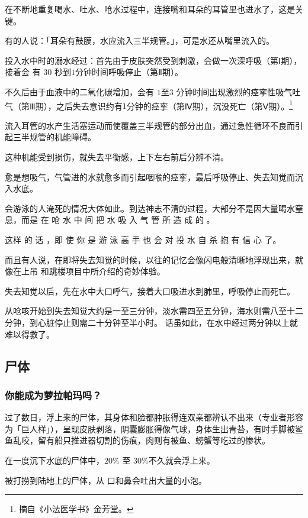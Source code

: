 \documentclass[UTF8]{ctexart}
\begin{document}
在不断地重复喝水、吐水、呛水过程中，连接嘴和耳朵的耳管里也进水了，这是关键。

有的人说：「耳朵有鼓膜，水应流入三半规管。」，可是水还从嘴里流入的。

投入水中时的溺水经过：首先由于皮肤突然受到刺激，会做一次深呼吸（第Ⅰ期），接着会 有 $30$ 秒到$1$分钟时间呼吸停止（第Ⅱ期）。

不久后由于血液中的二氧化碳增加，会有 $1$至$3$ 分钟时间出现激烈的痉挛性吸气吐气（第Ⅲ期），之后失去意识约有$1$分钟的痉挛（第Ⅳ期），沉没死亡（第Ⅴ期）。\footnote{摘自《小法医学书》金芳堂。}

流入耳管的水产生活塞运动而使覆盖三半规管的部分出血，通过急性循环不良而引起三半规管的机能障碍。

这种机能受到损伤，就失去平衡感，上下左右前后分辨不清。

愈是想吸气，气管进的水就愈多而引起咽喉的痉挛，最后呼吸停止、失去知觉而沉入水底。

会游泳的人淹死的情况大体如此。到达神志不清的过程，大部分不是因大量喝水窒息，而是 在 呛 水 中 间 把 水 吸 入 气 管 所 造 成 的 。

这样 的 话 ，即 使 你 是 游 泳 高 手 也 会 对 投 水 自 杀 抱 有 信 心 了。

而且有人说，在即将失去知觉的时候，以往的记忆会像闪电般清晰地浮现出来，就像在上吊 和跳楼项目中所介绍的奇妙体验。

失去知觉以后，先在水中大口呼气，接着大口吸进水到肺里，呼吸停止而死亡。

从呛咳开始到失去知觉大约是一至三分钟，淡水需四至五分钟，海水则需八至十二分钟，到心脏停止则需二十分钟至半小时。
话虽如此，在水中经过两分钟以上就难以得救了。


\subsection{尸体}

\subsubsection*{你能成为萝拉帕玛吗？}

过了数日，浮上来的尸体，其身体和脸都肿胀得连双亲都辨认不出来（专业者形容为「巨人样」），呈现皮肤剥落，阴囊膨胀得像气球，身体生出青苔，有时手脚被鲨鱼乱咬，留有船只推进器切割的伤痕，肉则有被鱼、螃蟹等吃过的惨状。

在一度沉下水底的尸体中，$20\%$ 至 $30\%$不久就会浮上来。

被打捞到陆地上的尸体，从 口和鼻会吐出大量的小泡。
\end{document}
